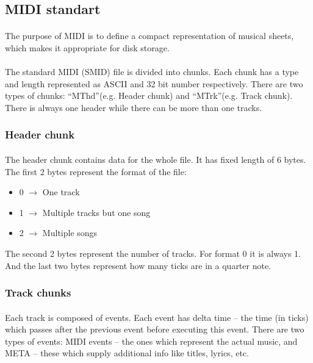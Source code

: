 \documentclass[]{article}
\begin{document}
        \subsection {MIDI standart}
        \paragraph{} The purpose of MIDI\cite{midi} is to define a compact representation of musical sheets, which makes it appropriate for disk storage.\paragraph{}
            The standard MIDI (SMID) file is divided into chunks. Each chunk has a type and length represented as ASCII and 32 bit number respectively. There are two types of chunks: ``MThd''(e.g. Header chunk) and ``MTrk''(e.g. Track chunk). There is always one header while there can be more than one tracks.
            \subsubsection{Header chunk}
            \paragraph{}The header chunk contains data for the whole file. It has fixed length of 6 bytes. The first 2 bytes represent the format of the file:
                \begin{itemize}
                    \item 0 $\to$ One track
                    \item 1 $\to$ Multiple tracks but one song
                    \item 2 $\to$ Multiple songs
                \end{itemize}
                The second 2 bytes represent the number of tracks. For format 0 it is always 1. And the last two bytes represent how many ticks are in a quarter note.
            \subsubsection{Track chunks}
            \paragraph{}Each track is composed of events. Each event has delta time -- the time (in ticks) which passes after the previous event before executing this event. There are two types of events: MIDI events -- the ones which represent the actual music, and META -- these which supply additional info like titles, lyrics, etc.
\end{document}
